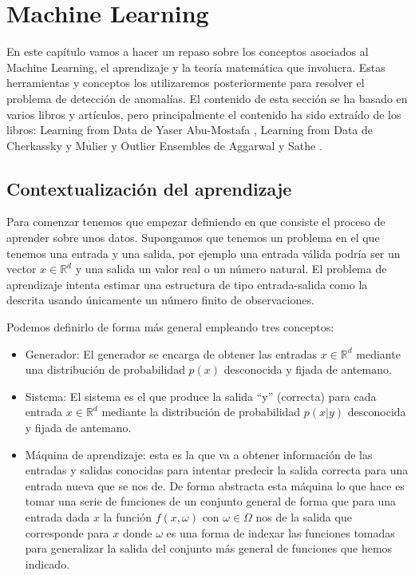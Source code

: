 \chapter{Machine Learning}
\label{chapter:machine_learning}

En este capítulo vamos a hacer un repaso sobre los conceptos asociados al Machine Learning, el aprendizaje y la teoría matemática que involucra. Estas herramientas y conceptos los utilizaremos posteriormente para resolver el problema de detección de anomalías. El contenido de esta sección se ha basado en varios libros y artículos, pero principalmente el contenido ha sido extraído de los libros: Learning from Data de Yaser Abu-Mostafa \cite{yaser_learning_2012}, Learning from Data de Cherkassky y Mulier \cite{cherkassky_learning_2007}  y Outlier Ensembles de Aggarwal y Sathe \cite{aggarwal_outlier_2017}.

\section{Contextualización del aprendizaje}

Para comenzar tenemos que empezar definiendo en que consiste el proceso de aprender sobre unos datos. Supongamos que tenemos un problema en el que tenemos una entrada y una salida, por ejemplo una entrada válida podría ser un vector $x\in \mathbb{R}^d$ y una salida un valor real o un número natural. El problema de aprendizaje intenta estimar una estructura de tipo entrada-salida como la descrita usando únicamente un número finito de observaciones.

Podemos definirlo de forma más general empleando tres conceptos:

\begin{itemize}
	\item Generador: El generador se encarga de obtener las entradas $x\in \mathbb{R}^d$ mediante una distribución de probabilidad $p(x)$ desconocida y fijada de antemano.
	\item Sistema: El sistema es el que produce la salida ``y'' (correcta) para cada entrada $x\in \mathbb{R}^d$ mediante la distribución de probabilidad $p(x|y)$ desconocida y fijada de antemano.
	\item Máquina de aprendizaje: esta es la que va a obtener información de las entradas y salidas conocidas para intentar predecir la salida correcta para una entrada nueva que se nos de. De forma abstracta esta máquina lo que hace es tomar una serie de funciones de un conjunto general de forma que para una entrada dada $x$ la función $f(x,\omega)$ con $\omega \in \Omega$ nos de la salida que corresponde para $x$ donde $\omega$ es una forma de indexar las funciones tomadas para generalizar la salida del conjunto más general de funciones que hemos indicado.
\end{itemize}


